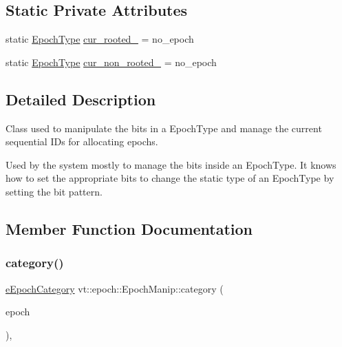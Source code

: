 \subsection*{Static Private Attributes}
\begin{DoxyCompactItemize}
\item 
static \hyperlink{namespacevt_a985a5adf291c34a3ca263b3378388236}{Epoch\+Type} \hyperlink{structvt_1_1epoch_1_1_epoch_manip_a855b3178e81730c751c6620b8146a575}{cur\+\_\+rooted\+\_\+} = no\+\_\+epoch
\item 
static \hyperlink{namespacevt_a985a5adf291c34a3ca263b3378388236}{Epoch\+Type} \hyperlink{structvt_1_1epoch_1_1_epoch_manip_a42a389acfdf4785f8eef141cb74f3bbb}{cur\+\_\+non\+\_\+rooted\+\_\+} = no\+\_\+epoch
\end{DoxyCompactItemize}


\subsection{Detailed Description}
Class used to manipulate the bits in a {\ttfamily Epoch\+Type} and manage the current sequential I\+Ds for allocating epochs. 

Used by the system mostly to manage the bits inside an {\ttfamily Epoch\+Type}. It knows how to set the appropriate bits to change the static type of an {\ttfamily Epoch\+Type} by setting the bit pattern. 

\subsection{Member Function Documentation}
\mbox{\label{structvt_1_1epoch_1_1_epoch_manip_aa61d47033545df147c01036211c4cabe}} 
\subsubsection{\texorpdfstring{category()}{category()}}
{\footnotesize\ttfamily \hyperlink{namespacevt_1_1epoch_a956abe0aceef0d10a988de8acb002c7c}{e\+Epoch\+Category} vt\+::epoch\+::\+Epoch\+Manip\+::category (\begin{DoxyParamCaption}\item[{\hyperlink{namespacevt_a985a5adf291c34a3ca263b3378388236}{Epoch\+Type} const \&}]{epoch }\end{DoxyParamCaption})\hspace{0.3cm}{\ttfamily [inline]}, {\ttfamily [static]}}



